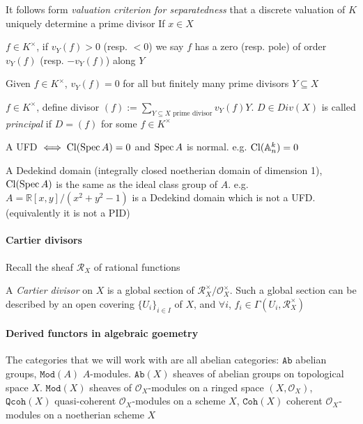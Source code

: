 \documentclass[main]{subfiles}
\begin{document}
\clubsuit\quad It follows form \textit{valuation criterion for separatedness} that a discrete valuation of $K$ uniquely determine a prime divisor
If $x\in X$

\begin{definition}
$f\in K^\times$, if $v_Y(f)>0$ (resp. $<0$) we say $f$ has a zero (resp. pole) of order $v_Y(f)$ (resp. $-v_Y(f)$) along $Y$
\end{definition}

\clubsuit\quad Given $f\in K^\times$, $v_Y(f)=0$ for all but finitely many prime divisors $Y\subseteq X$

\begin{definition}
$f\in K^\times$, define divisor $(f):=\sum_{Y\subseteq X\text{ prime divisor}}v_Y(f)Y$. $D\in Div(X)$ is called \textit{principal} if $D=(f)$ for some $f\in K^\times$
\end{definition}

\begin{example}
A UFD $\iff\operatorname{Cl}(\operatorname{Spec} A)=0$ and $\operatorname{Spec} A$ is normal. e.g. $\operatorname{Cl}(\mathbb A^k_n)=0$
\end{example}

\begin{example}
A Dedekind domain (integrally closed noetherian domain of dimension 1), $\operatorname{Cl}(\operatorname{Spec} A)$ is the same as the ideal class group of $A$. e.g. $A=\mathbb R[x,y]/(x^2+y^2-1)$ is a Dedekind domain which is not a UFD. (equivalently it is not a PID)
\end{example}

\paragraph{Cartier divisors} Recall the sheaf $\mathcal R_X$ of rational functions

\begin{definition}
A \textit{Cartier divisor} on $X$ is a global section of $\mathcal R_X^\times/\mathcal O_X^\times$. Such a global section can be described by an open covering $\{U_i\}_{i\in I}$ of $X$, and $\forall i$, $f_i\in\Gamma(U_i,\mathcal R_X^\times)$
\end{definition}

\paragraph{Derived functors in algebraic goemetry} The categories that we will work with are all abelian categories: $\texttt{Ab}$ abelian groups, $\texttt{Mod}(A)$ $A$-modules. $\texttt{Ab}(X)$ sheaves of abelian groups on topological space $X$. $\texttt{Mod}(X)$ sheaves of $\mathcal O_X$-modules on a ringed space $(X,\mathcal O_X)$, $\texttt{Qcoh}(X)$ quasi-coherent $\mathcal O_X$-modules on a scheme $X$, $\texttt{Coh}(X)$ coherent $\mathcal O_X$-modules on a noetherian scheme $X$
\end{document}
